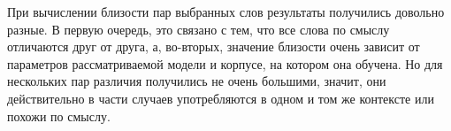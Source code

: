\documentclass[oneside,final,12pt]{article}
\begin{document}
При вычислении близости пар выбранных слов результаты получились довольно разные. В первую очередь, это связано с тем, что все слова по смыслу отличаются друг от друга, а, во-вторых, значение близости очень зависит от параметров рассматриваемой модели и корпусе, на котором она обучена. Но для нескольких пар различия получились не очень большими, значит, они действительно в части случаев употребляются в одном и том же контексте или похожи по смыслу.
\end{document}
